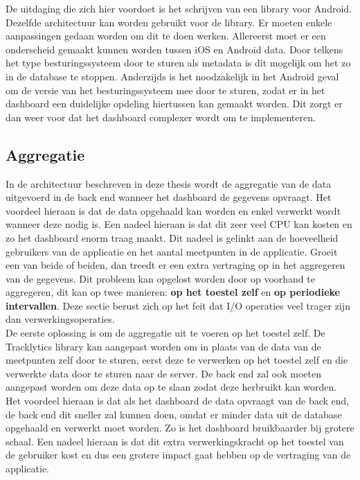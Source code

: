 De uitdaging die zich hier voordoet is het schrijven van een library voor Android. Dezelfde architectuur kan worden gebruikt voor de library. Er moeten enkele aanpassingen gedaan worden om dit te doen werken. Allereerst moet er een onderscheid gemaakt kunnen worden tussen iOS en Android data. Door telkens het type besturingssysteem door te sturen als metadata is dit mogelijk om het zo in de database te stoppen. Anderzijds is het noodzakelijk in het Android geval om de versie van het besturingssysteem mee door te sturen, zodat er in het dashboard een duidelijke opdeling hiertussen kan gemaakt worden. Dit zorgt er dan weer voor dat het dashboard complexer wordt om te implementeren.



\subsection{Aggregatie}
In de architectuur beschreven in deze thesis wordt de aggregatie van de data uitgevoerd in de back end wanneer het dashboard de gegevens opvraagt. Het voordeel hieraan is dat de data opgehaald kan worden en enkel verwerkt wordt wanneer deze nodig is. Een nadeel hieraan is dat dit zeer veel CPU kan kosten en zo het dashboard enorm traag maakt. Dit nadeel is gelinkt aan de hoeveelheid gebruikers van de applicatie en het aantal meetpunten in de applicatie. Groeit een van beide of beiden, dan treedt er een extra vertraging op in het aggregeren van de gegevens. Dit probleem kan opgelost worden door op voorhand te aggregeren, dit kan op twee manieren: \textbf{op het toestel zelf} en \textbf{op periodieke intervallen}. Deze sectie berust zich op het feit dat I/O operaties veel trager zijn dan verwerkingsoperaties.\\

De eerste oplossing is om de aggregatie uit te voeren op het toestel zelf. De Tracklytics library kan aangepast worden om in plaats van de data van de meetpunten zelf door te sturen, eerst deze te verwerken op het toestel zelf en die verwerkte data door te sturen naar de server. De back end zal ook moeten aangepast worden om deze data op te slaan zodat deze herbruikt kan worden. Het voordeel hieraan is dat als het dashboard de data opvraagt van de back end, de back end dit sneller zal kunnen doen, omdat er minder data uit de database opgehaald en verwerkt moet worden. Zo is het dashboard bruikbaarder bij grotere schaal. Een nadeel hieraan is dat dit extra verwerkingskracht op het toestel van de gebruiker kost en dus een grotere impact gaat hebben op de vertraging van de applicatie. \\

